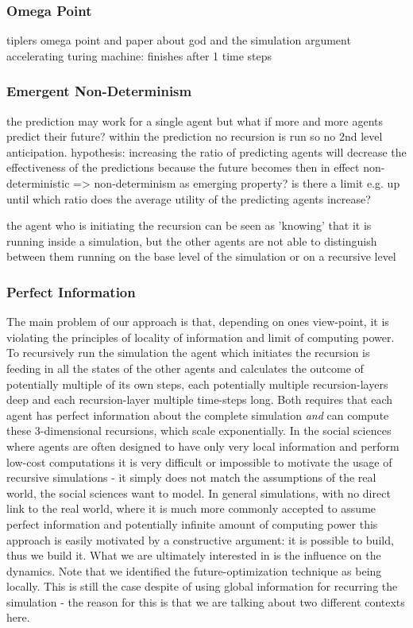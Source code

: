 \subsubsection{Omega Point}
tiplers omega point and paper about god and the simulation argument
accelerating turing machine: finishes after 1 time steps
 
\subsubsection{Emergent Non-Determinism}
the prediction may work for a single agent but what if more and more agents predict their future? within the prediction no recursion is run so no 2nd level anticipation. 
hypothesis: increasing the ratio of predicting agents will decrease the effectiveness of the predictions because the future becomes then in effect non-deterministic => non-determinism as emerging property? is there a limit e.g. up until which ratio does the average utility of the predicting agents increase?

the agent who is initiating the recursion can be seen as 'knowing' that it is running inside a simulation, but the other agents are not able to distinguish between them running on the base level of the simulation or on a recursive level

\subsubsection{Perfect Information}
The main problem of our approach is that, depending on ones view-point, it is violating the principles of locality of information and limit of computing power. To recursively run the simulation the agent which initiates the recursion is feeding in all the states of the other agents and calculates the outcome of potentially multiple of its own steps, each potentially multiple recursion-layers deep and each recursion-layer multiple time-steps long. Both requires that each agent has perfect information about the complete simulation \textit{and} can compute these 3-dimensional recursions, which scale exponentially.
In the social sciences where agents are often designed to have only very local information and perform low-cost computations it is very difficult or impossible to motivate the usage of recursive simulations - it simply does not match the assumptions of the real world, the social sciences want to model.
In general simulations, with no direct link to the real world, where it is much more commonly accepted to assume perfect information and potentially infinite amount of computing power this approach is easily motivated by a constructive argument: it is possible to build, thus we build it.
What we are ultimately interested in is the influence on the dynamics.
Note that we identified the future-optimization technique as being locally. This is still the case despite of using global information for recurring the simulation - the reason for this is that we are talking about two different contexts here.

